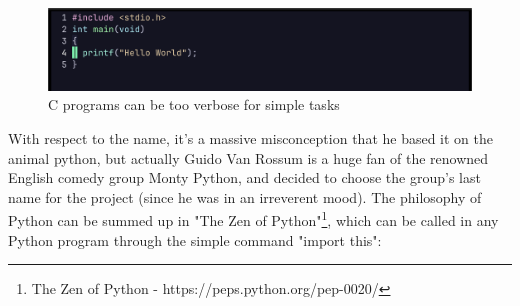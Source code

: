 \documentclass[twoside,final]{hcmut-report}
\begin{document}
\begin{figure}[ht]
\centering
\includegraphics[width=\textwidth]{graphics/c_program.png}
\caption{C programs can be too verbose for simple tasks}
\end{figure}

\hspace*{3mm} With respect to the name, it's a massive misconception that he based it on the animal python, but actually Guido Van Rossum is a huge fan of the renowned English comedy group Monty Python, and decided to choose the group's last name for the project (since he was in an irreverent mood). 
The philosophy of Python can be summed up in "The Zen of Python"\footnote{The Zen of Python - https://peps.python.org/pep-0020/}, which can be called in any Python program through the simple command "import this":
\end{document}
